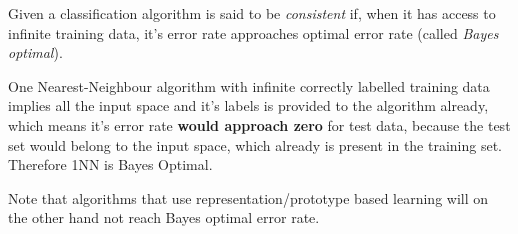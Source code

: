 \documentclass[a4paper,11pt]{article}
\begin{document}
\begin{mlsolution}

Given a classification algorithm is said to be \textit{consistent} if, when it has access to infinite training data, it's error rate approaches optimal error rate (called \textit{Bayes optimal}).

One Nearest-Neighbour algorithm with infinite correctly labelled training data implies all the input space and it's labels is provided to the algorithm already, which means it's error rate \textbf{would approach zero} for test data, because the test set would belong to the input space, which already is present in the training set. Therefore 1NN is Bayes Optimal.

Note that algorithms that use representation/prototype based learning will on the other hand not reach Bayes optimal error rate.

\end{mlsolution}
\end{document}
